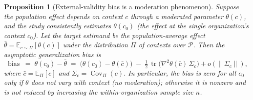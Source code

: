 \documentclass{amsart}
\newtheorem{proposition}{Proposition}
\theoremstyle{definition}
\begin{document}
\begin{proposition}[External-validity bias is a moderation phenomenon]
\label{prop:ev}
Suppose the population effect depends on context $c$ through a moderated
parameter $\theta(c)$, and the study consistently estimates
$\theta(c_0)$ (the effect at the single organization's context $c_0$).
Let the target estimand be the population-average effect
$\bar\theta=\mathbb{E}_{c\sim\Pi}[\theta(c)]$ under the distribution $\Pi$
of contexts over $\mathcal{P}$. Then the asymptotic generalization bias is
\[
  \operatorname{bias} \;=\; \theta(c_0)-\bar\theta
   \;=\; \big(\theta(c_0)-\theta(\bar c)\big)
        \;-\;\tfrac12\,\operatorname{tr}\!\big(\nabla^2\theta(\bar c)\,
        \Sigma_c\big)+o(\|\Sigma_c\|),
\]
where $\bar c=\mathbb{E}_\Pi[c]$ and $\Sigma_c=\operatorname{Cov}_\Pi(c)$.
In particular, the bias is zero for all $c_0$ \emph{only if} $\theta$ does
not vary with context (no moderation); otherwise it is nonzero and is
\emph{not} reduced by increasing the within-organization sample size $n$.
\end{proposition}
\end{document}
